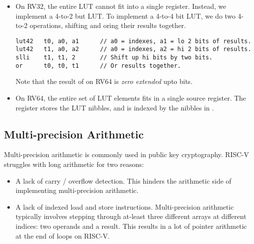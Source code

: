\begin{itemize}
\item[\mnemonic{lut42}] 
    On RV32, the entire LUT cannot fit into a single register.
    Instead, we implement a 4-to-2 but LUT. To implement a 4-to-4 bit
    LUT, we do two 4-to-2 operations, shifting and oring their results
    together.

    \begin{lstlisting}[style=ASM]
lut42   t0, a0, a1      // a0 = indexes, a1 = lo 2 bits of results.
lut42   t1, a0, a2      // a0 = indexes, a2 = hi 2 bits of results.
slli    t1, t1, 2       // Shift up hi bits by two bits.
or      t0, t0, t1      // Or results together.
    \end{lstlisting}

    Note that the result of  on RV64 is {\em zero extended}
    upto \XLEN bits.

\item[\mnemonic{lut44}]
    On RV64, the entire set of LUT elements fits in a single source register.
    The \rstwo register stores the LUT nibbles, and is indexed by the nibbles
    in \rsone.
\end{itemize}


\subsection{Multi-precision Arithmetic}

Multi-precision arithmetic is commonly used in public key cryptography.
RISC-V struggles with long arithmetic for two reasons:

\begin{itemize}
\item A lack of carry / overflow detection. This hinders the arithmetic
    side of implementing multi-precision arithmetic.

\item A lack of indexed load and store instructions.
    Multi-precision arithmetic typically involves stepping through
    at-least three different arrays at different indices: two operands
    and a result.
    This results in a lot of pointer arithmetic at the end of loops
    on RISC-V.
\end{itemize}


